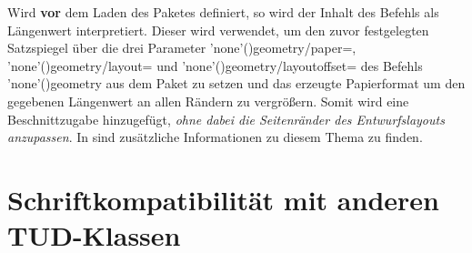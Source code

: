 \begin{DeclareEntity}{}
\begin{Declaration}
Wird  \textbf{vor} dem Laden des Paketes 
definiert, so wird der Inhalt des Befehls als Längenwert interpretiert. Dieser 
wird verwendet, um den zuvor festgelegten Satzspiegel über die drei Parameter
\Macro*'none'(){geometry/paper=},
\Macro*'none'(){geometry/layout=} und 
\Macro*'none'(){geometry/layoutoffset=} des
Befehls \Macro*'none'(){geometry} aus dem Paket 
 zu setzen und das erzeugte Papierformat um den gegebenen 
Längenwert an allen Rändern zu vergrößern. Somit wird eine Beschnittzugabe 
hinzugefügt, \emph{ohne dabei die Seitenränder des Entwurfslayouts anzupassen}. 
In  sind zusätzliche Informationen zu diesem Thema zu 
finden.%
\end{Declaration}
%
\end{DeclareEntity}



\section[%
  Das Paket \Package{fix-tudscrfonts} -- Schriftkompatibilität%
]{%
  Schriftkompatibilität mit anderen TUD-Klassen%
}

